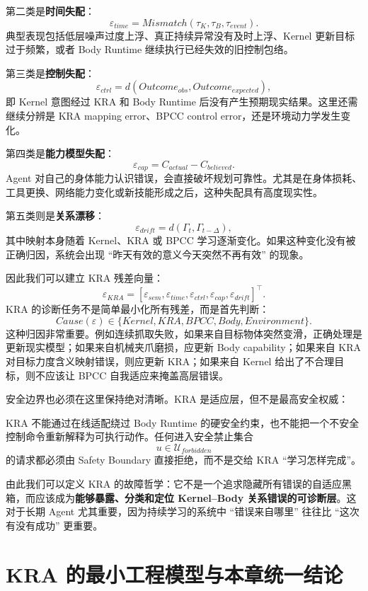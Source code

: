 第二类是\textbf{时间失配}：
\[
\varepsilon_{time}
=
Mismatch
\left(
\tau_K,
\tau_B,
\tau_{event}
\right).
\]
典型表现包括低层噪声过度上浮、真正持续异常没有及时上浮、Kernel 更新目标过于频繁，或者 Body Runtime 继续执行已经失效的旧控制包络。

第三类是\textbf{控制失配}：
\[
\varepsilon_{ctrl}
=
d
\left(
Outcome_{obs},
Outcome_{expected}
\right),
\]
即 Kernel 意图经过 KRA 和 Body Runtime 后没有产生预期现实结果。这里还需继续分辨是 KRA mapping error、BPCC control error，还是环境动力学发生变化。

第四类是\textbf{能力模型失配}：
\[
\varepsilon_{cap}
=
C_{actual}
-
C_{believed}.
\]
Agent 对自己的身体能力认识错误，会直接破坏规划可靠性。尤其是在身体损耗、工具更换、网络能力变化或新技能形成之后，这种失配具有高度现实性。

第五类则是\textbf{关系漂移}：
\[
\varepsilon_{drift}
=
d
\left(
\Gamma_t,
\Gamma_{t-\Delta}
\right),
\]
其中映射本身随着 Kernel、KRA 或 BPCC 学习逐渐变化。如果这种变化没有被正确归因，系统会出现 ``昨天有效的意义今天突然不再有效'' 的现象。

因此我们可以建立 KRA 残差向量：
\[
\boxed{
\varepsilon_{KRA}
=
\left[
\varepsilon_{sem},
\varepsilon_{time},
\varepsilon_{ctrl},
\varepsilon_{cap},
\varepsilon_{drift}
\right]^{\top}.
}
\]
KRA 的诊断任务不是简单最小化所有残差，而是首先判断：
\[
Cause(\varepsilon)
\in
\{
Kernel,
KRA,
BPCC,
Body,
Environment
\}.
\]
这种归因非常重要。例如连续抓取失败，如果来自目标物体突然变滑，正确处理是更新现实模型；如果来自机械夹爪磨损，应更新 Body capability；如果来自 KRA 对目标力度含义映射错误，则应更新 KRA；如果来自 Kernel 给出了不合理目标，则不应该让 BPCC 自我适应来掩盖高层错误。

安全边界也必须在这里保持绝对清晰。KRA 是适应层，但不是最高安全权威：
\begin{statementbox}
\centering
{}
\end{statementbox}
KRA 不能通过在线适配绕过 Body Runtime 的硬安全约束，也不能把一个不安全控制命令重新解释为可执行动作。任何进入安全禁止集合
\[
u\in\mathcal U_{forbidden}
\]
的请求都必须由 Safety Boundary 直接拒绝，而不是交给 KRA ``学习怎样完成''。

由此我们可以定义 KRA 的故障哲学：它不是一个追求隐藏所有错误的自适应黑箱，而应该成为\textbf{能够暴露、分类和定位 Kernel--Body 关系错误的可诊断层}。这对于长期 Agent 尤其重要，因为持续学习的系统中 ``错误来自哪里'' 往往比 ``这次有没有成功'' 更重要。

\section{KRA 的最小工程模型与本章统一结论}
\label{sec:kra-minimal-model}

